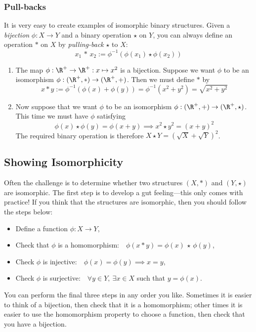 \subsubsection*{Pull-backs}

It is very easy to create examples of isomorphic binary structures. Given a \emph{bijection} $\phi:X\to Y$ and a binary operation $\star$ on $Y$, you can always define an operation $*$ on $X$ by \emph{pulling-back} $\star$ to $X$:
\[x_1\,*\,x_2:=\phi^{-1}(\phi(x_1)\star\phi(x_2))\]


\begin{enumerate}
  \item The map $\phi:\R^+\to\R^+:x\mapsto x^2$ is a bijection. Suppose we want $\phi$ to be an isomorphism $\phi:(\R^+,*)\to(\R^+,+)$. Then we must define $*$ by
	\[x*y:=\phi^{-1}(\phi(x)+\phi(y))=\phi^{-1}(x^2+y^2)=\sqrt{x^2+y^2}\]
	\item Now suppose that we want $\phi$ to be an isomorphism $\phi:(\R^+,+)\to(\R^+,\star)$. This time we must have $\phi$ satisfying
	\[\phi(x)\star\phi(y)=\phi(x+y)\implies x^2\star y^2=(x+y)^2\]
	The required binary operation is therefore $X\star Y=(\sqrt X+\sqrt Y)^2$.
\end{enumerate}


\subsection*{Showing Isomorphicity}

Often the challenge is to determine whether two structures $(X,*)$ and $(Y,\star)$ are isomorphic. The first step is to develop a gut feeling---this only comes with practice! If you think that the structures are isomorphic, then you should follow the steps below:
\begin{itemize}\renewcommand{\itemsep}{0cm}
  \item Define a function $\phi:X\to Y$,
  \item Check that $\phi$ is a homomorphism:\ \ $\phi(x*y)=\phi(x)\,\star\,\phi(y)$,
  \item Check $\phi$ is injective:\ \ $\phi(x)=\phi(y)\implies x=y$,
  \item Check $\phi$ is surjective:\ \ $\forall y\in Y,\ \exists x\in X$ such that $y=\phi(x)$.
\end{itemize}
You can perform the final three steps in any order you like. Sometimes it is easier to think of a bijection, then check that it is a homomorphism; other times it is easier to use the homomorphism property to choose a function, then check that you have a bijection.

